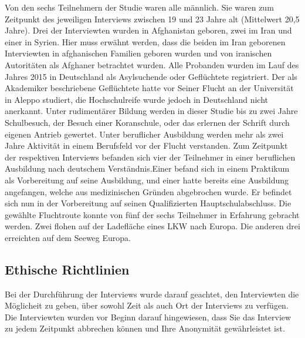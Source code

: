 Von den sechs Teilnehmern der Studie waren alle männlich. Sie waren zum Zeitpunkt des jeweiligen Interviews zwischen 19 und 23 Jahre alt (Mittelwert 20,5 Jahre). Drei der Interviewten wurden in Afghanistan geboren, zwei im Iran und einer in Syrien. \newline 
Hier muss erwähnt werden, dass die beiden im Iran geborenen Interviewten in afghanischen Familien geboren wurden und von iranischen Autoritäten als Afghaner betrachtet wurden.\newline
Alle Probanden wurden im Lauf des Jahres 2015 in Deutschland als Asylsuchende oder Geflüchtete registriert. Der als Akademiker beschriebene Geflüchtete hatte vor Seiner Flucht an der Universität in Aleppo studiert, die Hochschulreife wurde jedoch in Deutschland nicht anerkannt.\newline
Unter rudimentärer Bildung werden in dieser Studie bis zu zwei Jahre Schulbesuch, der Besuch einer Koranschule, oder das erlernen der Schrift durch eigenen Antrieb gewertet.\newline
Unter beruflicher Ausbildung werden mehr als zwei Jahre Aktivität in einem Berufsfeld vor der Flucht verstanden.\newline
Zum Zeitpunkt der respektiven Interviews befanden sich vier der Teilnehmer in einer beruflichen Ausbildung nach deutschem Verständnis.\newline Einer befand sich in einem Praktikum als Vorbereitung auf seine Ausbildung, und einer hatte bereits eine Ausbildung angefangen, welche aus medizinischen Gründen abgebrochen wurde. Er befindet sich nun in der Vorbereitung auf seinen Qualifizierten Hauptschulabschluss.\newline
Die gewählte Fluchtroute konnte von fünf der sechs Teilnehmer in Erfahrung gebracht werden. Zwei flohen auf der Ladefläche eines LKW nach Europa. Die anderen drei erreichten auf dem Seeweg Europa.


\subsection{Ethische Richtlinien}

Bei der Durchführung der Interviews wurde darauf geachtet, den Interviewten die Möglicheit zu geben, über sowohl Zeit als auch Ort der Interviews zu verfügen. Die Interviewten wurden vor Beginn darauf hingewiesen, dass Sie das Interview zu jedem Zeitpunkt abbrechen können und Ihre Anonymität gewährleistet ist.\newline

